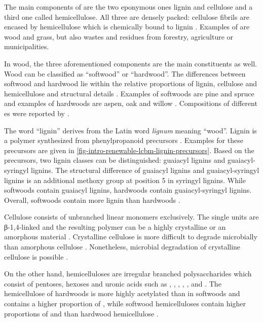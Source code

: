 The main components of \lcbm{} are the two eponymous ones lignin and cellulose and a third one called hemicellulose. All three are densely packed: cellulose fibrils are encased by hemicellulose which is chemically bound to lignin \cite{Palmqvist2000b}. Examples of \lcbm{} are wood and grass, but also wastes and residues from forestry, agriculture or municipalities.

In wood, the three aforementioned components are the main constituents as well. Wood can be classified as \enquote{softwood} or \enquote{hardwood}. The differences between softwood and hardwood lie within the relative proportions of lignin, cellulose and hemicellulose and structural details \cite{Palmqvist2000b}. Examples of softwoods are pine and spruce and examples of hardwoods are aspen, oak and willow \cite{Saka2001}. Compositions of different \lcbm{}es were reported by \textcite{Sun2002}.

The word \enquote{lignin} derives from the Latin word \textit{lignum} meaning \enquote{wood}. Lignin is a polymer synthesized from phenylpropanoid precursors \cite{Adler1977, Palmqvist2000b}. Examples for these precursors are given in \vref{fig-intro-renewable-lcbm-lignin-precursors}. Based on the precursors, two lignin classes can be distinguished: guaiacyl lignins and guaiacyl-syringyl lignins. The structural difference of guaiacyl lignins and guaiacyl-syringyl lignins is an additional methoxy group at position 5 in syringyl lignins. While softwoods contain guaiacyl lignins, hardwoods contain guaiacyl-syringyl lignins. Overall, softwoods contain more lignin than hardwoods \cite{Saka2001}.

Cellulose consists of unbranched linear \glc{} monomers exclusively. The single \glc{} units are β-1,4-linked and the resulting polymer can be a highly crystalline or an amorphous material \cite{Fan1982}. Crystalline cellulose is more difficult to degrade microbially than amorphous cellulose \cite{Beguin1994}. Nonetheless, microbial degradation of crystalline cellulose is possible \cite{Klyosov1986, Beeson2015}.

On the other hand, hemicelluloses are irregular branched polysaccharides which consist of pentoses, hexoses and uronic acids such as \ara{}, \xyl{}, \gal{}, \glc{}, \man{}, \glcua{} and \galua{} \cite{Saka2001}. The hemicellulose of hardwoods is more highly acetylated than in softwoods and contains a higher proportion of \xyl{}, while softwood hemicelluloses contain higher proportions of \glc{} and \man{} than hardwood hemicellulose \cite{Fengel1989}.

